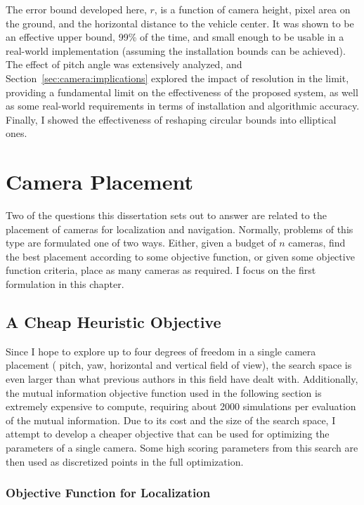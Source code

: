 \documentclass[a4paper,12pt,twoside,openright]{report}
\begin{document}
The error bound developed here, $r$, is a function of camera height,
pixel area on the ground, and the horizontal distance to the vehicle center.
It was shown to be an effective upper bound, 99\% of the time, and
small enough to be usable in a real-world implementation (assuming
the installation bounds can be achieved). The effect of pitch angle
was extensively analyzed, and Section~\ref{sec:camera:implications}
explored the impact of resolution in the limit, providing a 
fundamental limit on the effectiveness of the proposed system,
as well as some real-world requirements in terms of
installation and algorithmic accuracy. Finally, I showed
the effectiveness of reshaping circular bounds into elliptical ones.


\chapter{Camera Placement}
\label{chap:cameraplacement}

Two of the questions this dissertation sets out to answer
are related to the placement of cameras for localization and navigation.
Normally, problems of this type are formulated one of two ways. Either,
given a budget of $n$ cameras, find the best placement according to
some objective function, or given some objective function criteria,
place as many cameras as required. I focus on the first formulation
in this chapter.


\section{A Cheap Heuristic Objective}
\label{cameraplacement:cheap}

Since I hope to explore up to four degrees of freedom in a single camera placement (
pitch, yaw, horizontal and vertical field of view), the search space is even larger
than what previous authors in this field have dealt with. Additionally,
the mutual information objective function used in the following section is extremely expensive to compute, 
requiring about 2000 simulations per evaluation of the mutual information.
Due to its cost and the size of the search space, I attempt to develop a cheaper objective that can be used for optimizing
the parameters of a single camera. Some high scoring parameters from this search are then used
as discretized points in the full optimization.

\subsection{Objective Function for Localization}
\end{document}

